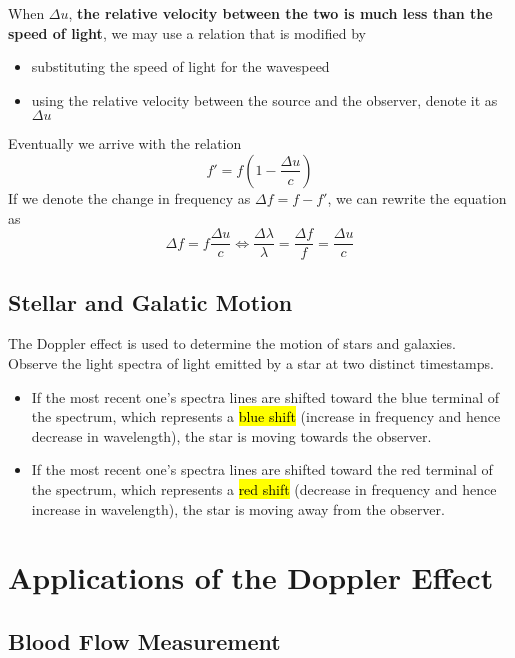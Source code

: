 \documentclass[a4paper,12pt]{article}
\let\oldsection\section
\renewcommand\section{\clearpage\oldsection}
\newcommand{\lb}{\\[8pt]}
\newcommand{\paren}[1]{\left(#1\right)}
\begin{document}
When $\Delta u$, \textbf{the relative velocity between the two is much less than the speed of light}, we may use a relation that is modified by
\begin{itemize}
  \item substituting the speed of light for the wavespeed
  \item using the relative velocity between the source and the observer, denote it as $\Delta u$
\end{itemize}
Eventually we arrive with the relation
\begin{equation}
  f' = f\paren{1 - \frac{\Delta u}{c}}
\end{equation}
If we denote the change in frequency as $\Delta f = f - f'$, we can rewrite the equation as
\begin{equation}
  \Delta f = f\frac{\Delta u}{c} \iff \frac{\Delta \lambda}{\lambda} = \frac{\Delta f}{f} = \frac{\Delta u}{c}
\end{equation}

\pagebreak

\subsection{Stellar and Galatic Motion}

The Doppler effect is used to determine the motion of stars and galaxies. \lb
Observe the light spectra of light emitted by a star at two distinct timestamps.
\begin{itemize}
  \item If the most recent one's spectra lines are shifted toward the blue terminal of the spectrum, which represents a \hl{blue shift} (increase in frequency and hence decrease in wavelength), the star is moving towards the observer.
  \item If the most recent one's spectra lines are shifted toward the red terminal of the spectrum, which represents a \hl{red shift} (decrease in frequency and hence increase in wavelength), the star is moving away from the observer.
\end{itemize}

\section{Applications of the Doppler Effect}

\subsection{Blood Flow Measurement}
\end{document}
